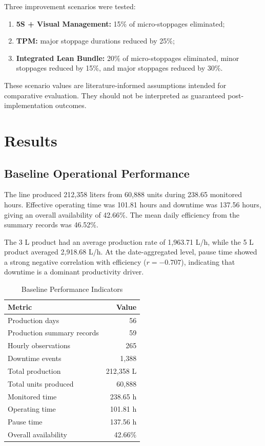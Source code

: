 \documentclass[journal]{IEEEtran}
\begin{document}
Three improvement scenarios were tested:
\begin{enumerate}
    \item \textbf{5S + Visual Management:} 15\% of micro-stoppages eliminated;
    \item \textbf{TPM:} major stoppage durations reduced by 25\%;
    \item \textbf{Integrated Lean Bundle:} 20\% of micro-stoppages eliminated, minor stoppages reduced by 15\%, and major stoppages reduced by 30\%.
\end{enumerate}

These scenario values are literature-informed assumptions intended for comparative evaluation. They should not be interpreted as guaranteed post-implementation outcomes.

\section{Results}
\subsection{Baseline Operational Performance}
The line produced 212,358 liters from 60,888 units during 238.65 monitored hours. Effective operating time was 101.81 hours and downtime was 137.56 hours, giving an overall availability of 42.66\%. The mean daily efficiency from the summary records was 46.52\%.

The 3 L product had an average production rate of 1,963.71 L/h, while the 5 L product averaged 2,918.68 L/h. At the date-aggregated level, pause time showed a strong negative correlation with efficiency ($r=-0.707$), indicating that downtime is a dominant productivity driver.

\begin{table}[!t]
\caption{Baseline Performance Indicators}
\label{tab:baseline}
\centering
\begin{tabular}{lr}
\toprule
Metric & Value \\
\midrule
Production days & 56 \\
Production summary records & 59 \\
Hourly observations & 265 \\
Downtime events & 1,388 \\
Total production & 212,358 L \\
Total units produced & 60,888 \\
Monitored time & 238.65 h \\
Operating time & 101.81 h \\
Pause time & 137.56 h \\
Overall availability & 42.66\% \\
\bottomrule
\end{tabular}
\end{table}
\end{document}
